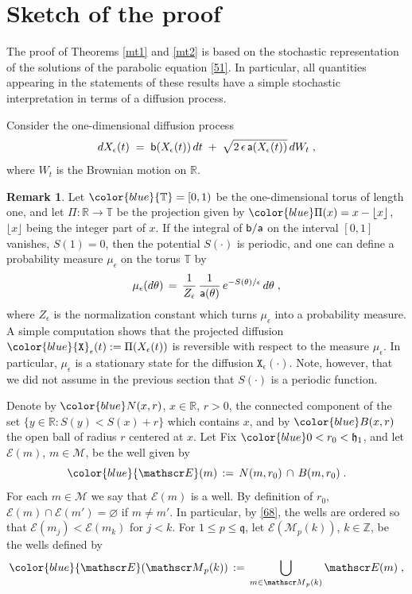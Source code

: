 \documentclass[reqno]{amsart}
\theoremstyle{plain}
\theoremstyle{definition}
\newtheorem{remark}[theorem]{Remark}
\newcommand{\mc}[1]{{\mathcal #1}}
\newcommand{\mf}[1]{{\mathfrak #1}}
\newcommand{\bb}[1]{{\mathbb #1}}
\newcommand{\ms}[1]{{\mathscr #1}}
\newcommand{\mss}[1]{{\textsf #1}}
\newcommand{\mtt}[1]{{\mathtt #1}}
\newcounter{as}[section]
\newcommand{\<}{\langle}
\renewcommand{\>}{\rangle}
\begin{document}
\section{Sketch of the proof}
\label{sec1}

The proof of Theorems \ref{mt1} and \ref{mt2} is based on the
stochastic representation of the solutions of the parabolic equation
\eqref{51}. In particular, all quantities appearing in the statements
of these results have a simple stochastic interpretation in terms of a
diffusion process.

Consider the one-dimensional diffusion process 
\begin{equation}
\label{03}
dX_\epsilon (t) \;=\; \mss b(X_\epsilon (t))\, dt \;+\;
\sqrt{2\, \epsilon \, \mss a (X_\epsilon (t))} \,
dW_t\;,
\end{equation}
where $W_t$ is the Brownian motion on $\bb R$.

\begin{remark}
Let $\color{blue} \bb T=[0,1)$ be the one-dimensional torus of length
one, and let $\Pi\colon \bb R\to \bb T$ be the projection given by
$\color{blue} \Pi(x) = x - \lfloor x\rfloor$, $\lfloor x\rfloor$ being
the integer part of $x$.  
If the integral of $\mss b/\mss a$ on the interval $[0,1]$ vanishes,
$S(1)=0$, then the potential $S(\cdot)$ is periodic, and one can
define a probability measure $\mu_\epsilon$ on the torus $\bb T$ by
\begin{equation*}
\mu_\epsilon(d\theta) \,=\, \frac{1}{Z_\epsilon}\,
\frac{1}{\mss a(\theta)}\,
e^{-S(\theta)/\epsilon}\, d\theta\;,
\end{equation*}
where $Z_\epsilon$ is the normalization constant which turns
$\mu_\epsilon$ into a probability measure.  A simple computation shows
that the projected diffusion
${\color{blue} \mtt X_\epsilon(t)}: = \Pi( X_\epsilon(t))$ is
reversible with respect to the measure $\mu_\epsilon$. In particular,
$\mu_\epsilon$ is a stationary state for the diffusion
$\mtt X_\epsilon(\cdot)$.  Note, however, that we did not assume in
the previous section that $S(\cdot)$ is a periodic function.
\end{remark}


Denote by $\color{blue} N(x,r)$, $x\in \bb R$, $r>0$, the connected
component of the set $\{y\in \bb R : S(y) < S(x) + r\}$ which contains
$x$, and by $\color{blue} B(x,r)$ the open ball of radius $r$ centered
at $x$. Let Fix $\color{blue} 0<r_0<\mf h_1$, and let $\ms E(m)$,
$m\in \mc M$, be the well given by
\begin{equation}
\label{71}
{\color{blue}\ms E(m)} \,:=\, N(m ,r_0)\,\cap\, B(m ,r_0)\;.
\end{equation}
For each $m\in \mc M$ we say that $\ms E(m)$ is a well.  By definition
of $r_0$, $\mc E(m) \cap \mc E(m')=\varnothing$ if $m\neq m'$. In
particular, by \eqref{68}, the wells are ordered so that
$\mc E(m_j) < \mc E(m_k)$ for $j<k$. For $1\le p\le \mf q$, let
$\ms E(\ms M_{p}(k))$, $k\in \bb Z$, be the wells defined by
\begin{equation}
\label{52}
{\color{blue}\ms E (\ms M_{p}(k))}
\,:=\, \bigcup_{m\in \ms M_{p}(k)}\ms E(m)\;,
\end{equation}
\end{document}
